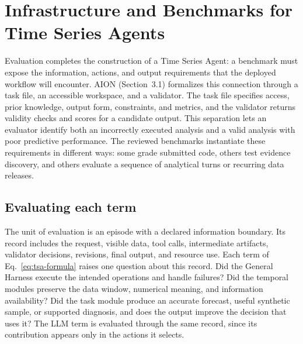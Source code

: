 \documentclass[preprints,article,submit,moreauthors]{Definitions/mdpi}
\begin{document}
\section{Infrastructure and Benchmarks for Time Series Agents}
\label{sec:evaluation}

Evaluation completes the construction of a Time Series Agent: a benchmark must expose the information, actions, and output requirements that the deployed workflow will encounter. AION \citep{aion2026} (Section~3.1) formalizes this connection through a task file, an accessible workspace, and a validator. The task file specifies access, prior knowledge, output form, constraints, and metrics, and the validator returns validity checks and scores for a candidate output. This separation lets an evaluator identify both an incorrectly executed analysis and a valid analysis with poor predictive performance. The reviewed benchmarks instantiate these requirements in different ways: some grade submitted code, others test evidence discovery, and others evaluate a sequence of analytical turns or recurring data releases.

\subsection{Evaluating each term}


The unit of evaluation is an episode with a declared information boundary. Its record includes the request, visible data, tool calls, intermediate artifacts, validator decisions, revisions, final output, and resource use. Each term of Eq.~\eqref{eq:tsa-formula} raises one question about this record. Did the General Harness execute the intended operations and handle failures? Did the temporal modules preserve the data window, numerical meaning, and information availability? Did the task module produce an accurate forecast, useful synthetic sample, or supported diagnosis, and does the output improve the decision that uses it? The LLM term is evaluated through the same record, since its contribution appears only in the actions it selects.
\end{document}
